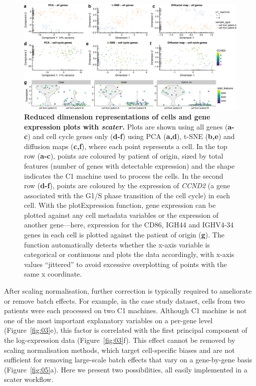 \documentclass[10pt,letterpaper]{article}
\begin{document}
\begin{figure}[htpb]%
\begin{adjustwidth}{-2in}{0in}
\begin{flushright}
\includegraphics[width=1.3\textwidth]{figure4}
\end{flushright}
\justify
\color{Gray}
\caption{\small \textbf{Reduced dimension representations of cells and gene expression plots with \emph{scater.}} Plots are shown using all genes (\textbf{a-c}) and cell cycle genes only (\textbf{d-f}) using PCA (\textbf{a,d}), t-SNE (\textbf{b,e}) and diffusion maps (\textbf{c,f}), where each point represents a cell. In the top row (\textbf{a-c}), points are coloured by patient of origin, sized by total features (number of genes with detectable expression) and the shape indicates the C1 machine used to process the cells. In the second row (\textbf{d-f}), points are coloured by the expression of \emph{CCND2} (a gene associated with the G1/S phase transition of the cell cycle) in each cell. With the plotExpression function, gene expression can be plotted against any cell metadata variables or the expression of another gene---here, expression for the CD86, IGH44 and IGHV4-34 genes in each cell is plotted against the patient of origin (\textbf{g}). The function automatically detects whether the x-axis variable is categorical or continuous and plots the data accordingly, with x-axis values ``jittered'' to avoid excessive overplotting of points with the same x coordinate.}\label{fig:04}
\end{adjustwidth}
\end{figure}


After scaling normalisation, further correction is typically required to ameliorate or remove batch effects. For example, in the case study dataset, cells from two patients were each processed on two C1 machines. Although C1 machine is not one of the most important explanatory variables on a per-gene level (Figure~\ref{fig:03}e), this factor is correlated with the first principal component of the log-expression data (Figure~\ref{fig:03}f). This effect cannot be removed by scaling normalisation methods, which target cell-specific biases and are not sufficient for removing large-scale batch effects that vary on a gene-by-gene basis (Figure~\ref{fig:05}a). Here we present two possibilities, all easily implemented in a scater workflow.
\end{document}
